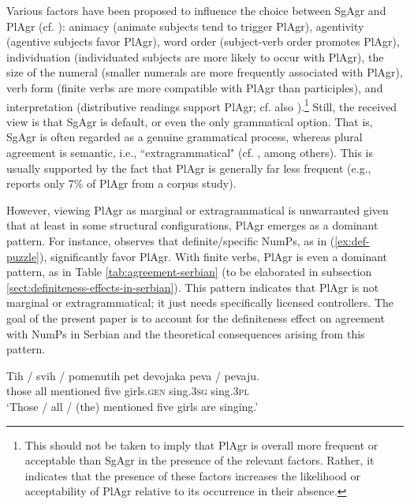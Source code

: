\documentclass[output=paper,colorlinks,citecolor=brown
]{langscibook}
\begin{document}
 \noindent Various factors have been proposed to influence the choice between SgAgr and PlAgr (cf. \citealt{Corbett2006, Corbett2010, Corbett2023, Milosavljevic2017, Milosavljevic2018MS, Milosavljevic2018nasledje, Milosavljevic2020}): animacy (animate subjects tend to trigger PlAgr), agentivity (agentive subjects favor PlAgr), word order (subject-verb order promotes PlAgr), individuation (individuated subjects are more likely to occur with PlAgr), the size of the numeral (smaller numerals are more frequently associated with PlAgr), verb form (finite verbs are more compatible with PlAgr than participles), and interpretation (distributive readings support PlAgr; cf. also \citealt{Bosnic2016}).\footnote{This should not be taken to imply that PlAgr is overall more frequent or acceptable than SgAgr in the presence of the relevant factors. Rather, it indicates that the presence of these factors increases the likelihood or acceptability of PlAgr relative to its occurrence in their absence.}
Still, the received view is that SgAgr is default, or even the only grammatical option. That is, SgAgr is often regarded as a genuine grammatical process, whereas plural agreement is semantic, i.e., “extragrammatical" (cf. \citealt{Franks1994, Franks1995, Boskovic2008, Boskovic2024, saric2014numeral}, among others). This is usually supported by the fact that PlAgr is generally far less frequent (e.g., \citealt{Corbett2004} reports only 7\% of PlAgr from a corpus study).   

However, viewing PlAgr as marginal or extragrammatical is unwarranted given that at least in some structural configurations, PlAgr emerges as a dominant pattern. For instance, \citet{Milosavljevic2017, Milosavljevic2018MS, Milosavljevic2018nasledje} observes that definite/specific NumPs, as in (\ref{ex:def-puzzle}), significantly favor PlAgr. With finite verbs, PlAgr is even a dominant pattern, as in Table \ref{tab:agreement-serbian} (to be elaborated in subsection \ref{sect:definiteness-effects-in-serbian}). This pattern indicates that PlAgr is not marginal or extragrammatical; it just needs specifically licensed controllers. The goal of the present paper is to account for the definiteness effect on agreement with NumPs in Serbian and the theoretical consequences arising from this pattern.


\ea 
\gll Tih  / svih / pomenutih pet devojaka peva / pevaju.\\
those \textsc{} all \textsc{} mentioned five girls.\textsc{gen} sing.\textsc{3sg} \textsc{} sing.\textsc{3pl}\\
\glt `Those / all / (the) mentioned five girls are singing.' \label{ex:def-puzzle}  
\z
\end{document}
